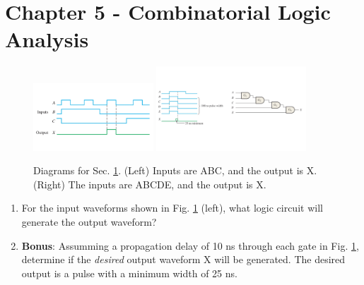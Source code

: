 \documentclass[10pt]{article}
\begin{document}
\clearpage

\section{Chapter 5 - Combinatorial Logic Analysis}
\label{sec:comb}
\begin{figure}[ht]
\centering
\includegraphics[width=0.4\textwidth,trim=0cm 3cm 0cm 2cm,clip=true]{timingExample7.pdf} \hspace{1cm}
\includegraphics[width=0.5\textwidth,trim=0cm 4cm 0cm 2cm,clip=true]{bonus.pdf}
\caption{\label{fig:timing3} Diagrams for Sec. \ref{sec:comb}. (Left) Inputs are ABC, and the output is X. (Right) The inputs are ABCDE, and the output is X.}
\end{figure}
\begin{enumerate}
\item For the input waveforms shown in Fig. \ref{fig:timing3} (left), what logic circuit will generate the output waveform? \\ \vspace{2cm}
\item \textbf{Bonus}: Assumming a propagation delay of 10 ns through each gate in Fig. \ref{fig:timing3}, determine if the \textit{desired} output waveform X will be generated.  The desired output is a pulse with a minimum width of 25 ns.
\end{enumerate}
\end{document}
